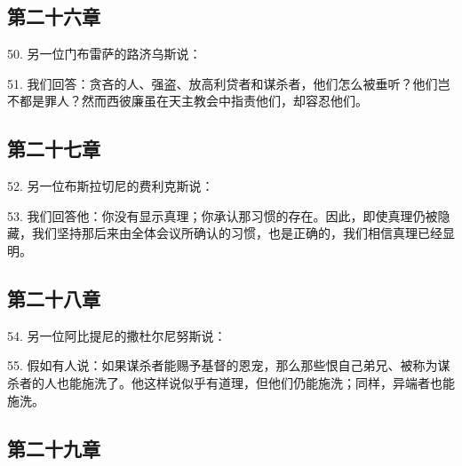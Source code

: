 
\subsection{第二十六章}

50. 另一位门布雷萨的路济乌斯说：\par

51. 我们回答：贪吝的人、强盗、放高利贷者和谋杀者，他们怎么被垂听？他们岂不都是罪人？然而西彼廉虽在天主教会中指责他们，却容忍他们。\par


\subsection{第二十七章}

52. 另一位布斯拉切尼的费利克斯说：\par

53. 我们回答他：你没有显示真理；你承认那习惯的存在。因此，即使真理仍被隐藏，我们坚持那后来由全体会议所确认的习惯，也是正确的，我们相信真理已经显明。\par


\subsection{第二十八章}

54. 另一位阿比提尼的撒杜尔尼努斯说：\par

55. 假如有人说：如果谋杀者能赐予基督的恩宠，那么那些恨自己弟兄、被称为谋杀者的人也能施洗了。他这样说似乎有道理，但他们仍能施洗；同样，异端者也能施洗。\par


\subsection{第二十九章}

